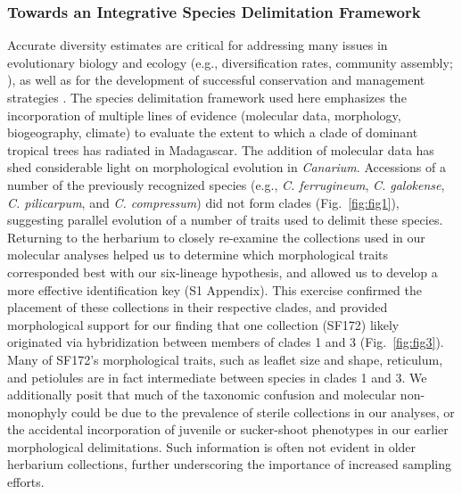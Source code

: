 \documentclass[10pt,letterpaper]{article}
\begin{document}
\subsubsection*{Towards an Integrative Species Delimitation Framework}
Accurate diversity estimates are critical for addressing many issues in evolutionary biology and ecology (e.g., diversification rates, community assembly; \cite{wiens_historical_2004}), as well as for the development of successful conservation and management strategies \cite{myers_biodiversity_2000}. The species delimitation framework used here emphasizes the incorporation of multiple lines of evidence (molecular data, morphology, biogeography, climate) to evaluate the extent to which a clade of dominant tropical trees has radiated in Madagascar. The addition of molecular data has shed considerable light on morphological evolution in \emph{Canarium}. Accessions of a number of the previously recognized species (e.g., \emph{C. ferrugineum}, \emph{C. galokense}, \emph{C. pilicarpum}, and \emph{C. compressum}) did not form clades (Fig.~\ref{fig:fig1}), suggesting parallel evolution of a number of traits used to delimit these species. Returning to the herbarium to closely re-examine the collections used in our molecular analyses helped us to determine which morphological traits corresponded best with our six-lineage hypothesis, and allowed us to develop a more effective identification key (S1 Appendix). This exercise confirmed the placement of these collections in their respective clades, and provided morphological support for our finding that one collection (SF172) likely originated via hybridization between members of clades 1 and 3 (Fig.~\ref{fig:fig3}). Many of SF172’s morphological traits, such as leaflet size and shape, reticulum, and petiolules are in fact intermediate between species in clades 1 and 3. We additionally posit that much of the taxonomic confusion and molecular non-monophyly could be due to the prevalence of sterile collections in our analyses, or the accidental incorporation of juvenile or sucker-shoot phenotypes in our earlier morphological delimitations. Such information is often not evident in older herbarium collections, further underscoring the importance of increased sampling efforts.
\end{document}
